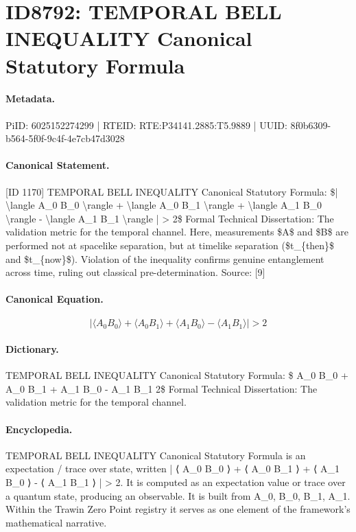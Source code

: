 \section*{ID8792: TEMPORAL BELL INEQUALITY Canonical Statutory Formula}
\paragraph{Metadata.}
PiID: 6025152274299 | RTEID: RTE:P34141.2885:T5.9889 | UUID: 8f0b6309-b564-5f0f-9c4f-4e7cb47d3028

\paragraph{Canonical Statement.}
[ID 1170] TEMPORAL BELL INEQUALITY Canonical Statutory Formula: \$| \textbackslash{}langle A\_0 B\_0 \textbackslash{}rangle + \textbackslash{}langle A\_0 B\_1 \textbackslash{}rangle + \textbackslash{}langle A\_1 B\_0 \textbackslash{}rangle - \textbackslash{}langle A\_1 B\_1 \textbackslash{}rangle | > 2\$ Formal Technical Dissertation: The validation metric for the temporal channel. Here, measurements \$A\$ and \$B\$ are performed not at spacelike separation, but at timelike separation (\$t\_\{then\}\$ and \$t\_\{now\}\$). Violation of the inequality confirms genuine entanglement across time, ruling out classical pre-determination. Source: [9]

\paragraph{Canonical Equation.}
\[
| \langle A_0 B_0 \rangle + \langle A_0 B_1 \rangle + \langle A_1 B_0 \rangle - \langle A_1 B_1 \rangle | > 2
\]

\paragraph{Dictionary.}
TEMPORAL BELL INEQUALITY Canonical Statutory Formula: \$ A\_0 B\_0 + A\_0 B\_1 + A\_1 B\_0 - A\_1 B\_1 2\$ Formal Technical Dissertation: The validation metric for the temporal channel.

\paragraph{Encyclopedia.}
TEMPORAL BELL INEQUALITY Canonical Statutory Formula is an expectation / trace over state, written | ⟨ A\_0 B\_0 ⟩ + ⟨ A\_0 B\_1 ⟩ + ⟨ A\_1 B\_0 ⟩ - ⟨ A\_1 B\_1 ⟩ | > 2. It is computed as an expectation value or trace over a quantum state, producing an observable. It is built from A\_0, B\_0, B\_1, A\_1. Within the Trawin Zero Point registry it serves as one element of the framework's mathematical narrative.

